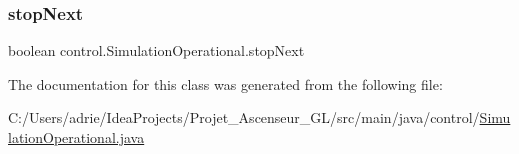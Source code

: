 \mbox{\label{classcontrol_1_1_simulation_operational_acda8346b0a85916ca536b13bcb704b33}} 
\subsubsection{\texorpdfstring{stopNext}{stopNext}}
{\footnotesize\ttfamily boolean control.\+Simulation\+Operational.\+stop\+Next\hspace{0.3cm}{\ttfamily [private]}}



The documentation for this class was generated from the following file\+:\begin{DoxyCompactItemize}
\item 
C\+:/\+Users/adrie/\+Idea\+Projects/\+Projet\+\_\+\+Ascenseur\+\_\+\+G\+L/src/main/java/control/\mbox{\hyperlink{_simulation_operational_8java}{Simulation\+Operational.\+java}}\end{DoxyCompactItemize}
